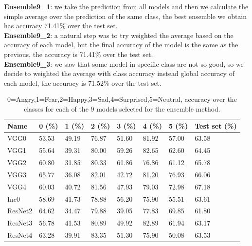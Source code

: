 \documentclass[10pt,twocolumn,letterpaper]{article}
\begin{document}
\newpage
\noindent\textbf{Ensemble9\_1}: we take the prediction from all models and then we calculate the simple average over the prediction of the same class, the best ensemble we obtain has accuracy 71.41\% over the test set.\\
\textbf{Ensemble9\_2}: a natural step was to try weighted the average based on the accuracy of each model, but the final accuracy of the model is the same as the previous, the accuracy is 71.41\% over the test set.\\
\textbf{Ensemble9\_3}: we saw that some model in specific class are not so good, so we decide to weighted the average with class accuracy instead global accuracy of each model, the accuracy is 71.52\% over the test set.

\def\arraystretch{1.2}
\begin{table}[H]
   \scriptsize
   \begin{tabular}{L{1.1cm}C{0.5cm}C{0.5cm}C{0.5cm}C{0.5cm}C{0.5cm}C{0.5cm}C{0.8cm}}
      \hline
      Name    & 0 (\%) & 1 (\%) & 2 (\%) & 3 (\%) & 4 (\%) & 5 (\%) & Test set (\%) \\
      \hline\hline
      VGG0    & 53.53  & 49.19  & 76.87  & 51.60  & 81.92  & 57.00  & 63.58         \\
      VGG1    & 55.64  & 39.31  & 80.00  & 59.26  & 82.65  & 62.60  & 64.45         \\
      VGG2    & 60.80  & 31.85  & 80.33  & 61.86  & 76.86  & 61.12  & 65.78         \\
      VGG3    & 65.77  & 36.08  & 82.01  & 42.72  & 81.20  & 76.93  & 66.06         \\
      VGG4    & 60.03  & 40.72  & 81.56  & 47.93  & 79.03  & 72.98  & 67.18         \\
      Inc0    & 58.69  & 41.73  & 78.88  & 56.20  & 75.90  & 55.51  & 63.61         \\
      ResNet2 & 64.62  & 34.47  & 79.88  & 39.05  & 77.83  & 69.85  & 61.80         \\
      ResNet3 & 56.78  & 41.53  & 80.89  & 49.92  & 82.89  & 61.94  & 63.17         \\
      ResNet4 & 63.28  & 39.91  & 83.35  & 51.30  & 75.90  & 50.08  & 63.53         \\
      \hline
   \end{tabular}
   \caption{ 0=Angry,1=Fear,2=Happy,3=Sad,4=Surprised,5=Neutral, accuracy over the classes for each of the 9 models selected for the ensemble method.}
   \label{table:modelli9}
\end{table}
\end{document}
